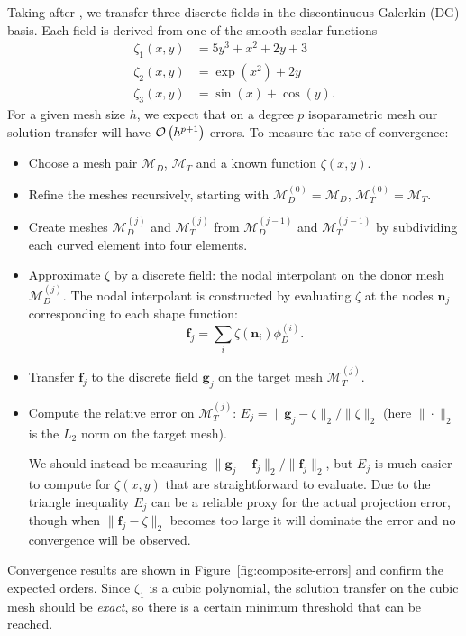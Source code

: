 Taking after \cite{Farrell2011}, we transfer three
discrete fields in the discontinuous Galerkin (DG) basis.
Each field is derived from one of the smooth scalar functions
\begin{align}
\zeta_1(x, y) &= 5 y^3 + x^2 + 2y + 3 \\
\zeta_2(x, y) &= \exp\left(x^2\right) + 2y \\
\zeta_3(x, y) &= \sin(x) + \cos(y).
\end{align}
For a given mesh size \(h\), we expect that on a degree \(p\) isoparametric
mesh our solution transfer will have \(\mathcal{O}\left(h^{p + 1}\right)\) errors. To measure
the rate of convergence:
\begin{itemize}
\itemsep 0em
\item Choose a mesh pair \(\mathcal{M}_D\), \(\mathcal{M}_T\) and
a known function \(\zeta(x, y)\).
\item Refine the meshes recursively, starting with
  \(\mathcal{M}_D^{(0)} = \mathcal{M}_D\),
  \(\mathcal{M}_T^{(0)} = \mathcal{M}_T\).
\item Create meshes
\(\mathcal{M}_D^{(j)}\) and \(\mathcal{M}_T^{(j)}\) from
\(\mathcal{M}_D^{(j - 1)}\)
and \(\mathcal{M}_T^{(j - 1)}\) by subdividing each curved
element into four elements.
\item Approximate \(\zeta\) by a discrete field: the nodal
interpolant on the donor mesh \(\mathcal{M}_D^{(j)}\). The
nodal interpolant is constructed by evaluating \(\zeta\) at the
nodes \(\bm{n}_j\) corresponding to each shape function:
\begin{equation}
\bm{f}_j = \sum_i \zeta\left(\bm{n}_i\right) \phi_D^{(i)}.
\end{equation}
\item Transfer \(\bm{f}_j\) to the discrete field \(\bm{g}_j\) on
the target mesh  \(\mathcal{M}_T^{(j)}\).
\item Compute the relative error on \(\mathcal{M}_T^{(j)}\):
\(E_j = \| \bm{g}_j - \zeta \|_2 / \| \zeta \|_2\) (here \(\| \cdot \|_2\)
is the \(L_2\) norm on the target mesh).

We should instead be measuring \(\| \bm{g}_j - \bm{f}_j \|_2 /
\| \bm{f}_j \|_2\), but \(E_j\) is much easier to
compute for \(\zeta(x, y)\) that are straightforward to evaluate.
Due to the triangle inequality \(E_j\) can be a reliable proxy
for the actual projection error, though when
\(\| \bm{f}_j - \zeta \|_2\) becomes too large it will dominate
the error and no convergence will be observed.
\end{itemize}

Convergence results are shown in Figure~\ref{fig:composite-errors}
and confirm the expected orders. Since \(\zeta_1\) is a cubic polynomial,
the solution transfer on the cubic mesh should be \emph{exact}, so there
is a certain minimum threshold that can be reached.

